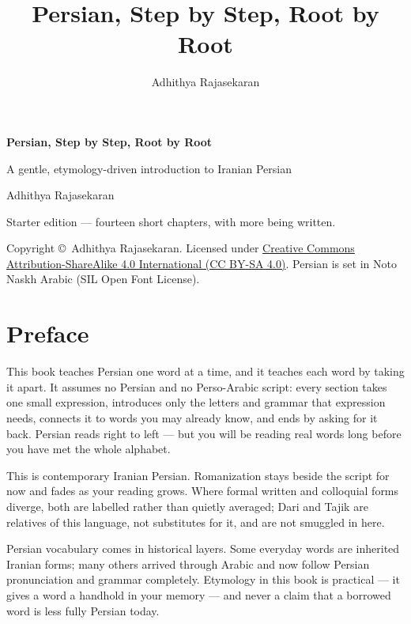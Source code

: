 \documentclass[11pt,twoside]{book}
\title{\Huge Persian, Step by Step, Root by Root}
\author{Adhithya Rajasekaran}
\date{}
\begin{document}
\frontmatter

\begin{titlepage}
  \centering
  \vspace*{3cm}
  {\Huge\bfseries Persian, Step by Step, Root by Root\par}
  \vspace{1cm}
  {\Large A gentle, etymology-driven introduction to Iranian Persian\par}
  \vspace{1.5cm}
  {\large Adhithya Rajasekaran\par}
  \vfill
  {\large Starter edition --- fourteen short chapters, with more being written.\par}
  \vspace{2cm}
  {\normalsize
    Copyright \copyright\ Adhithya Rajasekaran. Licensed under
    \href{https://creativecommons.org/licenses/by-sa/4.0/}%
    {Creative Commons Attribution-ShareAlike 4.0 International (CC BY-SA 4.0)}.
    Persian is set in Noto Naskh Arabic (SIL Open Font License).\par
  }
\end{titlepage}

\chapter*{Preface}

This book teaches Persian one word at a time, and it teaches each word by taking
it apart. It assumes no Persian and no Perso-Arabic script: every section takes
one small expression, introduces only the letters and grammar that expression
needs, connects it to words you may already know, and ends by asking for it
back. Persian reads right to left --- but you will be reading real words long
before you have met the whole alphabet.

This is contemporary Iranian Persian. Romanization stays beside the script for
now and fades as your reading grows. Where formal written and colloquial forms
diverge, both are labelled rather than quietly averaged; Dari and Tajik are
relatives of this language, not substitutes for it, and are not smuggled in
here.

Persian vocabulary comes in historical layers. Some everyday words are inherited
Iranian forms; many others arrived through Arabic and now follow Persian
pronunciation and grammar completely. Etymology in this book is practical --- it
gives a word a handhold in your memory --- and never a claim that a borrowed
word is less fully Persian today.
\end{document}
